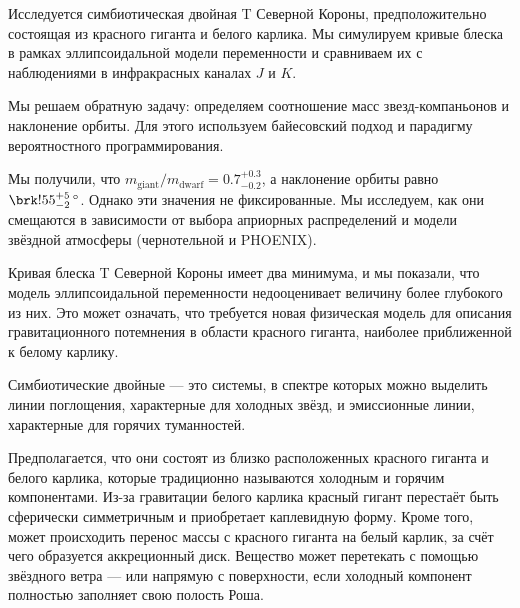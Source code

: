 

\usepackage{microtype}
\usepackage[extdef]{delimset}
\usepackage{csquotes} %
\usepackage{ragged2e}
\usepackage[hidelinks]{hyperref}
\usepackage{subfig}
\usepackage{tabularray}
\usepackage{epigraph}


\renewcommand{\div}{\operatorname{div}}




\setcounter{page}{2}



\newcommand{\resultq}{0.7^{+0.3}_{-0.2}}
\newcommand{\resulti}{\brk!{55^{+5}_{-2}}\, {}^\circ}


Исследуется симбиотическая двойная T Северной Короны, предположительно состоящая из красного гиганта и белого карлика. Мы симулируем кривые блеска в рамках эллипсоидальной модели переменности и сравниваем их с наблюдениями в инфракрасных каналах $J$ и $K$.

Мы решаем обратную задачу: определяем соотношение масс звезд-компаньонов и наклонение орбиты. Для этого используем байесовский подход и парадигму вероятностного программирования.

Мы получили, что $m_\text{giant} / m_\text{dwarf} = \resultq$, а наклонение орбиты равно $\resulti$. Однако эти значения не фиксированные. Мы исследуем, как они смещаются в зависимости от выбора априорных распределений и модели звёздной атмосферы (чернотельной и PHOENIX).

Кривая блеска T Северной Короны имеет два минимума, и мы показали, что модель эллипсоидальной переменности недооценивает величину более глубокого из них. Это может означать, что требуется новая физическая модель для описания гравитационного потемнения в области красного гиганта, наиболее приближенной к белому карлику.





Симбиотические двойные — это системы, в спектре которых можно выделить линии поглощения, характерные для холодных звёзд, и эмиссионные линии, характерные для горячих туманностей.

Предполагается, что они состоят из близко расположенных красного гиганта и белого карлика, которые традиционно называются холодным и горячим компонентами. Из-за гравитации белого карлика красный гигант перестаёт быть сферически симметричным и приобретает каплевидную форму. Кроме того, может происходить перенос массы с красного гиганта на белый карлик, за счёт чего образуется аккреционный диск. Вещество может перетекать с помощью звёздного ветра --- или напрямую с поверхности, если холодный компонент полностью заполняет свою полость Роша.

